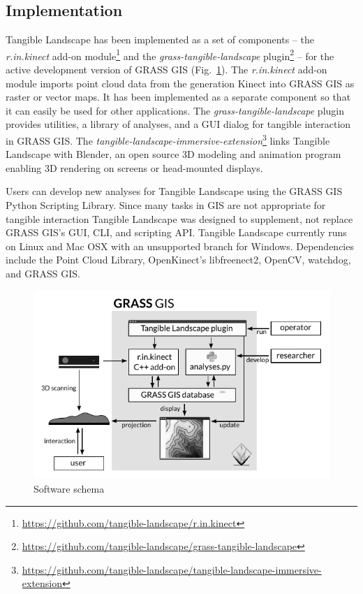 \documentclass[prodmode,acmtochi]{acmsmall} %
\begin{document}
\subsection{Implementation}
Tangible Landscape has been implemented as a set of components 
-- the \emph{r.in.kinect} add-on module\footnote{\url{https://github.com/tangible-landscape/r.in.kinect}}
and the \emph{grass-tangible-landscape} plugin\footnote{\url{https://github.com/tangible-landscape/grass-tangible-landscape}} --
for the active development version of GRASS GIS (Fig.~\ref{fig:software_schema}). 
The \emph{r.in.kinect} add-on module imports point cloud data from the  generation Kinect into GRASS GIS as raster or vector maps. 
It has been implemented as a separate component so that it can easily be used for other applications.
The \emph{grass-tangible-landscape} plugin provides 
utilities, a library of analyses, and a GUI dialog for tangible interaction in GRASS GIS.
The \emph{tangible-landscape-immersive-extension}\footnote{\url{https://github.com/tangible-landscape/tangible-landscape-immersive-extension}}
links Tangible Landscape with Blender, 
an open source 3D modeling and animation program \cite{Blender} 
enabling 3D rendering on screens or head-mounted displays.

Users can develop new analyses for Tangible Landscape 
using the GRASS GIS Python Scripting Library.  %
Since many tasks in GIS are not appropriate for tangible interaction
Tangible Landscape was designed to supplement, 
not replace GRASS GIS's GUI, CLI, and scripting API. 
Tangible Landscape currently runs on Linux and Mac OSX 
with an unsupported branch for Windows. 
Dependencies include the Point Cloud Library, OpenKinect's libfreenect2, 
OpenCV,  watchdog, and GRASS GIS.

\begin{figure}
\begin{center}
		\includegraphics{images/software-schema.pdf}
	\caption{Software schema}
	\label{fig:software_schema}
\end{center}
\end{figure}
\end{document}
